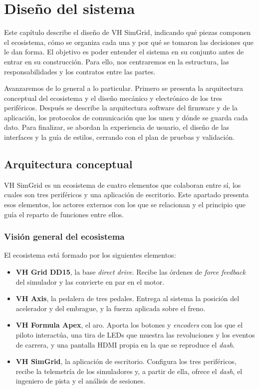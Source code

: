 \chapter{Diseño del sistema}
\label{cap:diseno}
Este capítulo describe el diseño de VH SimGrid, indicando qué piezas componen el ecosistema, cómo se organiza cada una y por qué se tomaron las decisiones que le dan forma. El objetivo es poder entender el sistema en su conjunto antes de entrar en su construcción. Para ello, nos centraremos en la estructura, las responsabilidades y los contratos entre las partes.

Avanzaremos de lo general a lo particular. Primero se presenta la arquitectura conceptual del ecosistema y el diseño mecánico y electrónico de los tres periféricos. Después se describe la arquitectura software del firmware y de la aplicación, los protocolos de comunicación que los unen y dónde se guarda cada dato. Para finalizar, se abordan la experiencia de usuario, el diseño de las interfaces y la guía de estilos, cerrando con el plan de pruebas y validación.

\section{Arquitectura conceptual}
\label{sec:arquitectura-conceptual}
VH SimGrid es un ecosistema de cuatro elementos que colaboran entre sí, los cuales son tres periféricos y una aplicación de escritorio. Este apartado presenta esos elementos, los actores externos con los que se relacionan y el principio que guía el reparto de funciones entre ellos.

\subsection{Visión general del ecosistema}
\label{subsec:vision-general}
El ecosistema está formado por los siguientes elementos:

\begin{itemize}
	\item \textbf{VH Grid DD15}, la base \textit{direct drive}. Recibe las órdenes de \textit{force feedback} del simulador y las convierte en par en el motor.
	\item \textbf{VH Axis}, la pedalera de tres pedales. Entrega al sistema la posición del acelerador y del embrague, y la fuerza aplicada sobre el freno.
	\item \textbf{VH Formula Apex}, el aro. Aporta los botones y \textit{encoders} con los que el piloto interactúa, una tira de LEDs que muestra las revoluciones y los eventos de carrera, y una pantalla HDMI propia en la que se reproduce el \textit{dash}.
	\item \textbf{VH SimGrid}, la aplicación de escritorio. Configura los tres periféricos, recibe la telemetría de los simuladores y, a partir de ella, ofrece el \textit{dash}, el ingeniero de pista y el análisis de sesiones.
\end{itemize}

